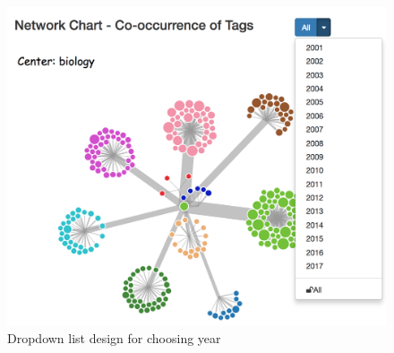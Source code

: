\documentclass{report}
\numberwithin{figure}{section}
\begin{document}
\begin{figure}
\begin{center}
\includegraphics[scale=0.5]{yeardropdown}
\caption{Dropdown list design for choosing year}
\label{fig:yeardropdown}
\end{center}
\end{figure}
\end{document}
